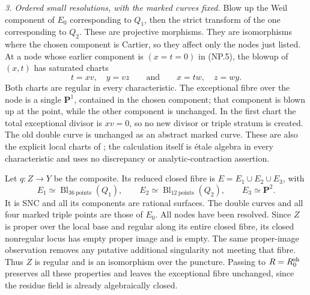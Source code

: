 \emph{3. Ordered small resolutions, with the marked curves fixed.}
Blow up the Weil component of $E_0$ corresponding to $Q_1$, then
the strict transform of the one corresponding to $Q_2$.
These are projective morphisms. They are isomorphisms where the
chosen component is Cartier, so they affect only the nodes just
listed. At a node whose earlier component is $(x=t=0)$ in
(NP.5), the blowup of $(x,t)$ has saturated charts
\[
 t=xv,\quad y=vz\qquad\text{and}\qquad
 x=tw,\quad z=wy.
                                                        \tag{NP.6}
\]
Both charts are regular in every characteristic. The exceptional
fibre over the node is a single $\mathbf P^1$, contained in the
chosen component; that component is blown up at the point, while
the other component is unchanged. In the first chart the total
exceptional divisor is $xv=0$, so no new divisor or triple stratum
is created. The old double curve is unchanged as an abstract
marked curve. These are also the explicit local charts of
\citet[Lemmas 15--16, published pp. 63--64]{frKollarSNC2014}; the
calculation itself is étale algebra in every characteristic and
uses no discrepancy or analytic-contraction assertion.

Let $q:Z\to Y$ be the composite. Its reduced closed fibre is
$E=E_1\cup E_2\cup E_3$, with
\[
 E_1\simeq\operatorname{Bl}_{36\ \mathrm{points}}(Q_1),
 \qquad E_2\simeq\operatorname{Bl}_{12\ \mathrm{points}}(Q_2),
 \qquad E_3\simeq\mathbf P^2.
                                                        \tag{NP.7}
\]
It is SNC and all its components are rational surfaces.
The double curves and all four marked triple points are those of
$E_0$. All nodes have been resolved. Since $Z$ is proper over the
local base and regular along its entire closed fibre, its closed
nonregular locus has empty proper image and is empty. The same
proper-image observation removes any putative additional
singularity not meeting that fibre. Thus $Z$ is regular and is an
isomorphism over the puncture. Passing to $R=R_0^{\rm sh}$ preserves
all these properties and leaves the exceptional fibre unchanged,
since the residue field is already algebraically closed.

